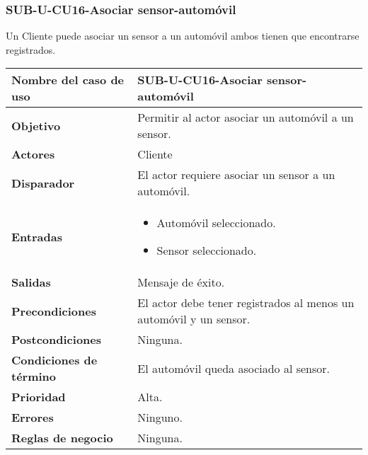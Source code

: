 \subsubsection{SUB-U-CU16-Asociar sensor-automóvil}\label{SUB-U-CU16}
Un Cliente puede asociar un sensor a un automóvil ambos tienen que encontrarse registrados.

\begin{longtable}{|J{5cm}|J{10.3cm}|}
	\hline
	\textbf{Nombre del caso de uso} &
		SUB-U-CU16-Asociar sensor-automóvil \\ \hline
	\textbf{Objetivo} &
		Permitir al actor asociar un automóvil a un sensor. \\ \hline
	\textbf{Actores} &
		Cliente \\ \hline 
	\textbf{Disparador} & 
		El actor requiere asociar un sensor a un automóvil. \\ \hline 
	\textbf{Entradas} & 
		\begin{itemize}
				\item Automóvil seleccionado.
				\item Sensor seleccionado.
		\end{itemize}\\ \hline 
	\textbf{Salidas} & Mensaje de éxito.
		\\ \hline
	\textbf{Precondiciones} &
		El actor debe tener registrados al menos un automóvil y un sensor.\\ \hline
	\textbf{Postcondiciones} & Ninguna.
		\\ \hline
	\textbf{Condiciones de término} & El automóvil queda asociado al sensor.
		\\ \hline 
	\textbf{Prioridad} & 
		Alta. \\ \hline
	\textbf{Errores} & Ninguno.
		\\ \hline
	\textbf{Reglas de negocio} & Ninguna.
		 \\ \hline
\end{longtable}

